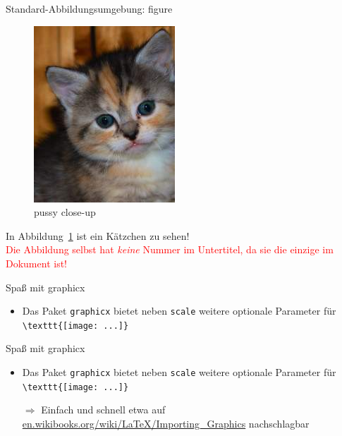 \documentclass[11pt]{beamer}
\begin{document}
\begin{frame}[fragile]{Standard-Abbildungsumgebung: figure}
\begin{figure}[h]
  \includegraphics[scale=.5]{250}
  \caption{pussy close-up}
  \label{fig:1}
\end{figure}
In Abbildung~\ref{fig:1} ist ein Kätzchen zu sehen!\\
\textcolor{red}{Die Abbildung selbst hat \emph{keine} Nummer im Untertitel, da sie die einzige im Dokument ist!}
\end{frame}

\begin{frame}[fragile]{Spaß mit graphicx}
\begin{itemize}
\item Das Paket \texttt{graphicx} bietet neben \texttt{scale} weitere optionale Parameter für \verb~\texttt{[image: ...]}~
\end{itemize}
\end{frame}

\begin{frame}[fragile]{Spaß mit graphicx}
\begin{itemize}
\item Das Paket \texttt{graphicx} bietet neben \texttt{scale} weitere optionale Parameter für \verb~\texttt{[image: ...]}~
\item[$\Rightarrow$] Einfach und schnell etwa auf\\
 \url{en.wikibooks.org/wiki/LaTeX/Importing_Graphics} nachschlagbar \smiley
\end{itemize}
\end{frame}
\end{document}
